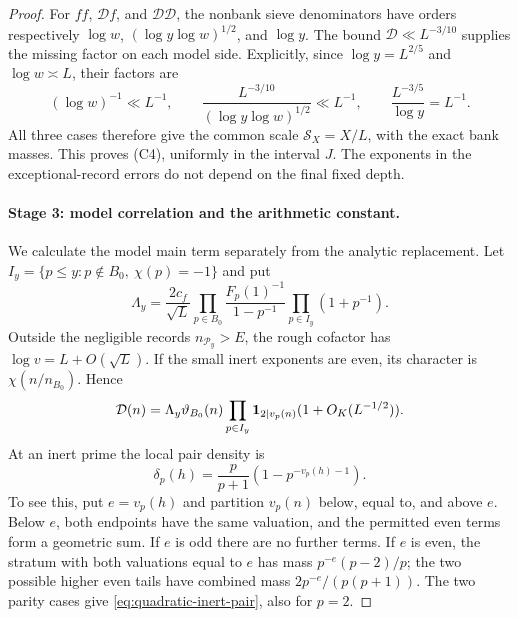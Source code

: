 \begin{proof}
For \(ff\), \(\mathcal D f\), and \(\mathcal D\mathcal D\), the nonbank sieve
denominators have orders respectively
\(\log w\), \((\log y\log w)^{1/2}\), and \(\log y\).
The bound \(\mathcal D\ll L^{-3/10}\) supplies the missing factor
on each model side. Explicitly, since \(\log y=L^{2/5}\)
and \(\log w\asymp L\), their factors are
\[
 (\log w)^{-1}\ll L^{-1},\qquad
 \frac{L^{-3/10}}{(\log y\log w)^{1/2}}\ll L^{-1},\qquad
 \frac{L^{-3/5}}{\log y}=L^{-1}.
\]
All three cases therefore give the common
scale \(\mathcal S_X=X/L\), with the exact bank masses.
This proves (C4), uniformly in the interval \(J\). The exponents
in the exceptional-record errors do not depend on the final
fixed depth.

\paragraph{Stage 3: model correlation and the arithmetic constant.}
We calculate the model main term separately from the analytic replacement. Let
\(I_y=\{p\le y:p\notin B_0,\ \chi(p)=-1\}\) and put
\[
 \Lambda_y=\frac{2c_f}{\sqrt L}
      \prod_{p\in B_0}\frac{F_p(1)^{-1}}{1-p^{-1}}
      \prod_{p\in I_y}(1+p^{-1}).
\]
Outside the negligible records \(n_{\mathcal P_y}>E\), the rough cofactor
has \(\log v=L+O(\sqrt L)\). If the small inert exponents
are even, its character is \(\chi(n/n_{B_0})\). Hence
\begin{equation}\label{eq:quadratic-model-leading}
 \mathcal D(n)=\Lambda_y\vartheta_{B_0}(n)
            \prod_{p\in I_y}\mathbf 1_{2\mid v_p(n)}
                                      (1+O_K(L^{-1/2})).
\end{equation}
At an inert prime the local pair density is
\begin{equation}\label{eq:quadratic-inert-pair}
 \delta_p(h)=\frac p{p+1}(1-p^{-v_p(h)-1}).
\end{equation}
To see this, put \(e=v_p(h)\) and partition \(v_p(n)\)
below, equal to, and above \(e\). Below \(e\), both endpoints
have the same valuation, and the permitted even terms form a
geometric sum. If \(e\) is odd there are no further terms.
If \(e\) is even, the stratum with both valuations equal to
\(e\) has mass \(p^{-e}(p-2)/p\); the two possible higher
even tails have combined mass \(2p^{-e}/(p(p+1))\).
The two parity cases give \eqref{eq:quadratic-inert-pair}, also
for \(p=2\).


\end{proof}
